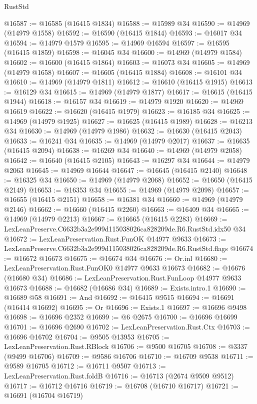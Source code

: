 \begin{lexlean}{RustStd}
\begin{coremodule}
@16587 := @16585 (@16415 @1834)
@16588 := @15989 @34
@16590 := @14969 (@14979 @1558)
@16592 := @16590 (@16415 @1844)
@16593 := @16017 @34
@16594 := @14979 @1579
@16595 := @14969 @16594
@16597 := @16595 (@16415 @1859)
@16598 := @16045 @34
@16600 := @14969 (@14979 @1584)
@16602 := @16600 (@16415 @1864)
@16603 := @16073 @34
@16605 := @14969 (@14979 @1658)
@16607 := @16605 (@16415 @1884)
@16608 := @16101 @34
@16610 := @14969 (@14979 @1811)
@16612 := @16610 (@16415 @1915)
@16613 := @16129 @34
@16615 := @14969 (@14979 @1877)
@16617 := @16615 (@16415 @1944)
@16618 := @16157 @34
@16619 := @14979 @1920
@16620 := @14969 @16619
@16622 := @16620 (@16415 @1979)
@16623 := @16185 @34
@16625 := @14969 (@14979 @1925)
@16627 := @16625 (@16415 @1989)
@16628 := @16213 @34
@16630 := @14969 (@14979 @1986)
@16632 := @16630 (@16415 @2043)
@16633 := @16241 @34
@16635 := @14969 (@14979 @2017)
@16637 := @16635 (@16415 @2094)
@16638 := @16269 @34
@16640 := @14969 (@14979 @2058)
@16642 := @16640 (@16415 @2105)
@16643 := @16297 @34
@16644 := @14979 @2063
@16645 := @14969 @16644
@16647 := @16645 (@16415 @2140)
@16648 := @16325 @34
@16650 := @14969 (@14979 @2068)
@16652 := @16650 (@16415 @2149)
@16653 := @16353 @34
@16655 := @14969 (@14979 @2098)
@16657 := @16655 (@16415 @2151)
@16658 := @16381 @34
@16660 := @14969 (@14979 @2146)
@16662 := @16660 (@16415 @2260)
@16663 := @16409 @34
@16665 := @14969 (@14979 @2213)
@16667 := @16665 (@16415 @2283)
@16669 := LexLeanPreserve.C6632b3a2e999d115038026ca828209de.R6.RustStd.idx50 @34
@16672 := LexLeanPreservation.Rust.FunOK @14977 @9633
@16673 := LexLeanPreserve.C6632b3a2e999d115038026ca828209de.R6.RustStd.flags
@16674 := @16672 @16673
@16675 := @16674 @34
@16676 := Or.inl
@16680 := LexLeanPreservation.Rust.FunOK0 @14977 @9633 @16673
@16682 := @16676 (@16680 @34)
@16686 := LexLeanPreservation.Rust.FunLoop @14977 @9633 @16673
@16688 := @16682 (@16686 @34)
@16689 := Exists.intro.{1}
@16690 := @16689 @58
@16691 := And
@16692 := @16415 @9515
@16694 := @16691 (@16414 @16692)
@16695 := Or
@16696 := Exists.{1}
@16697 := @16696 @9498
@16698 := @16696 @2352
@16699 := @6 @2675
@16700 := @16696 @16699
@16701 := @16696 @2690
@16702 := LexLeanPreservation.Rust.Ctx
@16703 := @16696 @16702
@16704 := @9505 @13953
@16705 := LexLeanPreservation.Rust.RBlock
@16706 := @9500 @16705
@16708 := @3337 (@9499 @16706)
@16709 := @9586 @16706
@16710 := @16709 @9538
@16711 := @9589 @16705
@16712 := @16711 @9507
@16713 := LexLeanPreservation.Rust.foldB
@16716 := @16713 (@2674 @9509 @9512)
@16717 := @16712 @16716
@16719 := @16708 (@16710 @16717)
@16721 := @16691 (@16704 @16719)

\end{coremodule}
\end{lexlean}
